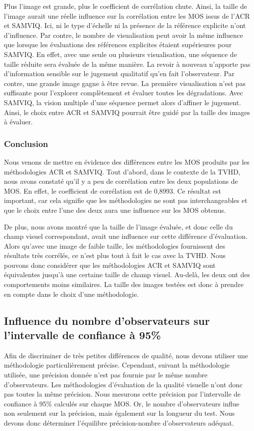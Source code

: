 Plus l'image est grande, plus le coefficient de corrélation chute. Ainsi, la taille de l'image aurait une réelle influence sur la corrélation entre les MOS issus de l'ACR et SAMVIQ. Ici, ni le type d'échelle ni la présence de la référence explicite n'ont d'influence. Par contre, le nombre de visualisation peut avoir la même influence que lorsque les évaluations des références explicites étaient supérieures pour SAMVIQ. En effet, avec une seule ou plusieurs visualisation, une séquence de taille réduite sera évaluée de la même manière. La revoir à nouveau n'apporte pas d'information sensible sur le jugement qualitatif qu'en fait l'observateur. Par contre, une grande image gagne à être revue. La première visualisation n'est pas suffisante pour l'explorer complètement et évaluer toutes les dégradations. Avec SAMVIQ, la vision multiple d'une séquence permet alors d'affiner le jugement. Ainsi, le choix entre ACR et SAMVIQ pourrait être guidé par la taille des images à évaluer.


\subsubsection{Conclusion}
Nous venons de mettre en évidence des différences entre les MOS produits par les méthodologies ACR et SAMVIQ. Tout d'abord, dans le contexte de la TVHD, nous avons constaté qu'il y a peu de corrélation entre les deux populations de MOS. En effet, le coefficient de corrélation est de 0,8993. Ce résultat est important, car cela signifie que les méthodologies ne sont pas interchangeables et que le choix entre l'une des deux aura une influence sur les MOS obtenus.

De plus, nous avons montré que la taille de l'image évaluée, et donc celle du champ visuel correspondant, avait une influence sur cette différence d'évaluation. Alors qu'avec une image de faible taille, les méthodologies fournissent des résultats très corrélés, ce n'est plus tout à fait le cas avec la TVHD. Nous pouvons donc considérer que les méthodologies ACR et SAMVIQ sont équivalentes jusqu'à une certaine taille de champ visuel. Au-delà, les deux ont des comportements moins similaires. La taille des images testées est donc à prendre en compte dans le choix d'une méthodologie.


\subsection{Influence du nombre d'observateurs sur l'intervalle de confiance à 95\%}
Afin de discriminer de très petites différences de qualité, nous devons utiliser une méthodologie particulièrement précise. Cependant, suivant la méthodologie utilisée, une précision donnée n'est pas fournie par le même nombre d'observateurs. Les méthodologies d'évaluation de la qualité visuelle n'ont donc pas toutes la même précision. Nous mesurons cette précision par l'intervalle de confiance à 95\% calculés sur chaque MOS. Or, le nombre d'observateurs influe non seulement sur la précision, mais également sur la longueur du test. Nous devons donc déterminer l'équilibre précision-nombre d'observateurs adéquat.


